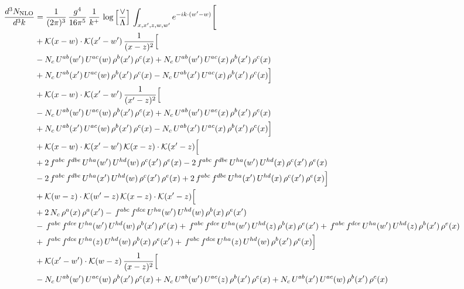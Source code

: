 \documentclass[9pt]{article}
\numberwithin{equation}{section}
\begin{document}
\begin{align}
\frac{d^{3}N_{\mathrm{NLO}}}{d^{3}k} & = \frac{1}{(2\pi)^{3}}\,\frac{g^{4}}{16\pi^{5}}\,\frac{1}{k^{+}}\,\log\Big[\frac{\vee}{\Lambda}\Big]\,\int_{x,x',z,w,w'}e^{-ik\cdot(w'-w)}\Bigg[ \notag\\
& +\mathcal{K}(x-w)\cdot\mathcal{K}(x'-w')\,\frac{1}{(x-z)^{2}}\Big[\notag\\
& -N_{c}\,U^{ab}(w')\,U^{ac}(w)\,\rho^{b}(x')\,\rho^{c}(x) +N_{c}\,U^{ab}(w')\,U^{ac}(x)\,\rho^{b}(x')\,\rho^{c}(x)\notag\\
& +N_{c}\,U^{ab}(x')\,U^{ac}(w)\,\rho^{b}(x')\,\rho^{c}(x) -N_{c}\,U^{ab}(x')\,U^{ac}(x)\,\rho^{b}(x')\,\rho^{c}(x)\Big]\notag\\
& +\mathcal{K}(x-w)\cdot\mathcal{K}(x'-w')\,\frac{1}{(x'-z)^{2}}\Big[\notag\\
& -N_{c}\,U^{ab}(w')\,U^{ac}(w)\,\rho^{b}(x')\,\rho^{c}(x) +N_{c}\,U^{ab}(w')\,U^{ac}(x)\,\rho^{b}(x')\,\rho^{c}(x)\notag\\
& +N_{c}\,U^{ab}(x')\,U^{ac}(w)\,\rho^{b}(x')\,\rho^{c}(x) -N_{c}\,U^{ab}(x')\,U^{ac}(x)\,\rho^{b}(x')\,\rho^{c}(x)\Big]\notag\\
& +\mathcal{K}(x-w)\cdot\mathcal{K}(x'-w')\,\mathcal{K}(x-z)\cdot\mathcal{K}(x'-z)\Big[\notag\\
& +2\,f^{abc}\,f^{dbe}\,U^{ha}(w')\,U^{hd}(w)\,\rho^{c}(x')\,\rho^{e}(x) -2\,f^{abc}\,f^{dbe}\,U^{ha}(w')\,U^{hd}(x)\,\rho^{c}(x')\,\rho^{e}(x)\notag\\
& -2\,f^{abc}\,f^{dbe}\,U^{ha}(x')\,U^{hd}(w)\,\rho^{c}(x')\,\rho^{e}(x) +2\,f^{abc}\,f^{dbe}\,U^{ha}(x')\,U^{hd}(x)\,\rho^{c}(x')\,\rho^{e}(x)\Big]\notag\\
& +\mathcal{K}(w-z)\cdot\mathcal{K}(w'-z)\,\mathcal{K}(x-z)\cdot\mathcal{K}(x'-z)\Big[\notag\\
& +2\,N_{c}\,\rho^{a}(x)\,\rho^{a}(x') -\,f^{abc}\,f^{dce}\,U^{ha}(w')\,U^{hd}(w)\,\rho^{b}(x)\,\rho^{e}(x')\notag\\
& -\,f^{abc}\,f^{dce}\,U^{ha}(w')\,U^{hd}(w)\,\rho^{b}(x')\,\rho^{e}(x) +\,f^{abc}\,f^{dce}\,U^{ha}(w')\,U^{hd}(z)\,\rho^{b}(x)\,\rho^{e}(x') +\,f^{abc}\,f^{dce}\,U^{ha}(w')\,U^{hd}(z)\,\rho^{b}(x')\,\rho^{e}(x)\notag\\
& +\,f^{abc}\,f^{dce}\,U^{ha}(z)\,U^{hd}(w)\,\rho^{b}(x)\,\rho^{e}(x') +\,f^{abc}\,f^{dce}\,U^{ha}(z)\,U^{hd}(w)\,\rho^{b}(x')\,\rho^{e}(x)\Big]\notag\\
& +\mathcal{K}(x'-w')\cdot\mathcal{K}(w-z)\,\frac{1}{(x-z)^{2}}\Big[\notag\\
& -N_{c}\,U^{ab}(w')\,U^{ac}(w)\,\rho^{b}(x')\,\rho^{c}(x) +N_{c}\,U^{ab}(w')\,U^{ac}(z)\,\rho^{b}(x')\,\rho^{c}(x) +N_{c}\,U^{ab}(x')\,U^{ac}(w)\,\rho^{b}(x')\,\rho^{c}(x)\notag\\

\end{align}
\end{document}
